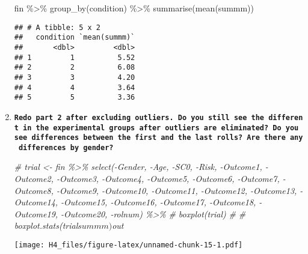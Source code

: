 \documentclass[
]{article}
\newenvironment{Shaded}{\begin{snugshade}}{\end{snugshade}}
\newcommand{\AttributeTok}[1]{\textcolor[rgb]{0.77,0.63,0.00}{#1}}
\newcommand{\CommentTok}[1]{\textcolor[rgb]{0.56,0.35,0.01}{\textit{#1}}}
\newcommand{\FunctionTok}[1]{\textcolor[rgb]{0.00,0.00,0.00}{#1}}
\newcommand{\NormalTok}[1]{#1}
\newcommand{\SpecialCharTok}[1]{\textcolor[rgb]{0.00,0.00,0.00}{#1}}
\newcommand{\StringTok}[1]{\textcolor[rgb]{0.31,0.60,0.02}{#1}}
\begin{document}
\begin{enumerate}
\begin{Shaded}
\begin{Highlighting}[]
\NormalTok{fin }\SpecialCharTok{\%\textgreater{}\%} \FunctionTok{group\_by}\NormalTok{(condition) }\SpecialCharTok{\%\textgreater{}\%} \FunctionTok{summarise}\NormalTok{(}\FunctionTok{mean}\NormalTok{(summm))}
\end{Highlighting}
\end{Shaded}

\begin{verbatim}
## # A tibble: 5 x 2
##   condition `mean(summm)`
##       <dbl>         <dbl>
## 1         1          5.52
## 2         2          6.08
## 3         3          4.20
## 4         4          3.64
## 5         5          3.36
\end{verbatim}
\item
  \textbf{\texttt{Redo\ part\ 2\ after\ excluding\ outliers.\ Do\ you\ still\ see\ the\ different\ in\ the\ experimental\ groups\ after\ outliers\ are\ eliminated?\ Do\ you\ see\ differences\ between\ the\ first\ and\ the\ last\ rolls?\ Are\ there\ any\ differences\ by\ gender?}}

\begin{Shaded}
\begin{Highlighting}[]
\CommentTok{\# trial \textless{}{-} fin \%\textgreater{}\% select({-}Gender, {-}Age, {-}SC0, {-}Risk, {-}Outcome1, {-}Outcome2, {-}Outcome3, {-}Outcome4, {-}Outcome5, {-}Outcome6, {-}Outcome7, {-}Outcome8, {-}Outcome9, {-}Outcome10, {-}Outcome11, {-}Outcome12, {-}Outcome13, {-}Outcome14, {-}Outcome15, {-}Outcome16, {-}Outcome17, {-}Outcome18, {-}Outcome19, {-}Outcome20, {-}rolnum) \%\textgreater{}\% }
\CommentTok{\#   boxplot(trial)}
\CommentTok{\# }
\CommentTok{\# boxplot.stats(trial$summm)$out }
\end{Highlighting}
\end{Shaded}

\begin{Shaded}
\end{Shaded}

  \texttt{[image: H4\_files/figure-latex/unnamed-chunk-15-1.pdf]}

\begin{Shaded}
\end{Shaded}


\end{enumerate}
\end{document}
